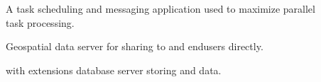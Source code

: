 \documentclass[letterpaper,12pt,english]{book}
\begin{document}
\begin{description}
\item[{{\hyperref[\detokenize{glossary:term-Celery}]{}}}] \leavevmode
\sphinxAtStartPar
A task scheduling and messaging application used to maximize parallel task processing.

\item[{{\hyperref[\detokenize{glossary:term-GeoServer}]{}}}] \leavevmode
\sphinxAtStartPar
Geospatial data server for sharing to {\hyperref[\detokenize{glossary:term-GeoNode}]{}} and end\sphinxhyphen{}users directly.

\item[{{\hyperref[\detokenize{glossary:term-GeoNode-db}]{}}}] \leavevmode
\sphinxAtStartPar
{\hyperref[\detokenize{glossary:term-PostgreSQL}]{}} with {\hyperref[\detokenize{glossary:term-PostGIS}]{}} extensions database server storing {\hyperref[\detokenize{glossary:term-GeoNode}]{}} {\hyperref[\detokenize{glossary:term-Django}]{}} and {\hyperref[\detokenize{glossary:term-GeoServer}]{}} data.

\end{description}
\end{document}
